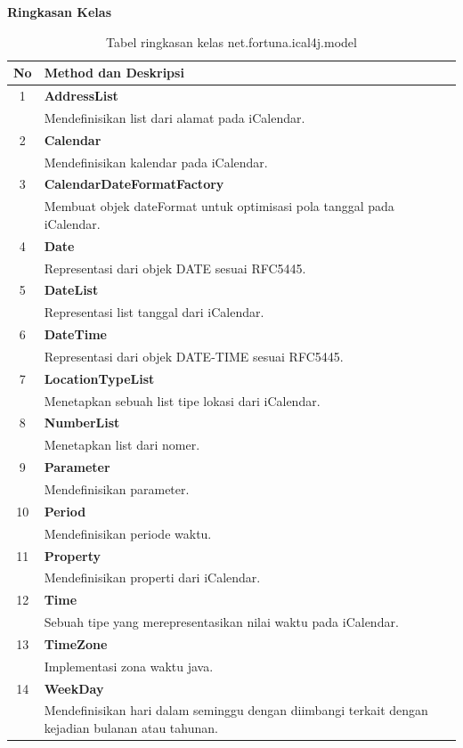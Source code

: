 	\noindent \textbf{Ringkasan Kelas}\cite{ical}
	\begin{table}[H]
		\centering
		\caption{Tabel ringkasan kelas net.fortuna.ical4j.model}
		\label{tab:kelas_net.fortuna.ical4j.model}
	\begin{tabular}{|c|p{12cm}|}
		\hline
		\textbf{No} & \textbf{Method dan Deskripsi} \\ \hline \hline
		1 & \textbf{AddressList}\\
			&	Mendefinisikan list dari alamat pada iCalendar.\\ \hline
		2 & \textbf{Calendar}\\
			&	Mendefinisikan kalendar pada iCalendar. \\ \hline
		3 & \textbf{CalendarDateFormatFactory}\\
			&	Membuat objek dateFormat untuk optimisasi pola tanggal pada iCalendar.\\ \hline
		4 & \textbf{Date}\\
			&	Representasi dari objek DATE sesuai RFC5445.\\ \hline
		5 & \textbf{DateList}\\
			&	Representasi list tanggal dari iCalendar.\\ \hline
		6 & \textbf{DateTime}\\
			&	Representasi dari objek DATE-TIME sesuai RFC5445.\\ \hline
		7 & \textbf{LocationTypeList}\\
			&	Menetapkan sebuah list tipe lokasi dari iCalendar.\\ \hline
		8 & \textbf{NumberList}\\
			&	Menetapkan list dari nomer.\\ \hline
		9 & \textbf{Parameter}\\
			&	Mendefinisikan parameter.\\ \hline
		10 & \textbf{Period}\\
			&	Mendefinisikan periode waktu.\\ \hline
		11 & \textbf{Property}\\
			&	Mendefinisikan properti dari iCalendar.\\ \hline		12 & \textbf{Time}\\
			&	Sebuah tipe yang merepresentasikan nilai waktu pada iCalendar.\\ \hline
		13 & \textbf{TimeZone}\\
			&	Implementasi zona waktu java.\\ \hline
		14 & \textbf{WeekDay}\\
			&	Mendefinisikan hari dalam seminggu dengan diimbangi terkait dengan kejadian bulanan atau tahunan.\\ \hline	
	\end{tabular}
\end{table}
	
